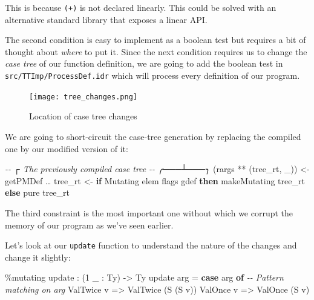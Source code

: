 \documentclass[
]{article}
\newenvironment{Shaded}{}{}
\newcommand{\CommentTok}[1]{\textcolor[rgb]{0.38,0.63,0.69}{\textit{#1}}}
\newcommand{\DataTypeTok}[1]{\textcolor[rgb]{0.56,0.13,0.00}{#1}}
\newcommand{\DecValTok}[1]{\textcolor[rgb]{0.25,0.63,0.44}{#1}}
\newcommand{\FunctionTok}[1]{\textcolor[rgb]{0.02,0.16,0.49}{#1}}
\newcommand{\KeywordTok}[1]{\textcolor[rgb]{0.00,0.44,0.13}{\textbf{#1}}}
\newcommand{\NormalTok}[1]{#1}
\newcommand{\OperatorTok}[1]{\textcolor[rgb]{0.40,0.40,0.40}{#1}}
\newcommand{\OtherTok}[1]{\textcolor[rgb]{0.00,0.44,0.13}{#1}}
\begin{document}
This is because \texttt{(+)} is not declared linearly. This could be
solved with an alternative standard library that exposes a linear API.

The second condition is easy to implement as a boolean test but requires
a bit of thought about \emph{where} to put it. Since the next condition
requires us to change the \emph{case tree} of our function definition,
we are going to add the boolean test in
\texttt{src/TTImp/ProcessDef.idr} which will process every definition of
our program.

\begin{figure}
\centering
\texttt{[image: tree\_changes.png]}
\caption{Location of case tree changes}
\end{figure}

We are going to short-circuit the case-tree generation by replacing the
compiled one by our modified version of it:

\begin{Shaded}
\begin{Highlighting}[]
\CommentTok{{-}{-}            ┌ The previously compiled case tree}
\CommentTok{{-}{-}        ╭───┴───╮}
\NormalTok{(rargs }\OperatorTok{**}\NormalTok{ (tree\_rt\textquotesingle{}, \_)) }\OtherTok{\textless{}{-}}\NormalTok{ getPMDef …}
\NormalTok{tree\_rt }\OtherTok{\textless{}{-}} \KeywordTok{if} \DataTypeTok{Mutating} \OtherTok{\textasciigrave{}elem\textasciigrave{}}\NormalTok{ flags gdef}
              \KeywordTok{then}\NormalTok{ makeMutating tree\_rt\textquotesingle{}}
              \KeywordTok{else} \FunctionTok{pure}\NormalTok{ tree\_rt\textquotesingle{}}
\end{Highlighting}
\end{Shaded}

The third constraint is the most important one without which we corrupt
the memory of our program as we've seen earlier.

Let's look at our \texttt{update} function to understand the nature of
the changes and change it slightly:

\begin{Shaded}
\begin{Highlighting}[]
\OperatorTok{\%}\NormalTok{mutating}
\NormalTok{update }\OperatorTok{:}\NormalTok{ (}\DecValTok{1}\NormalTok{ \_ }\OperatorTok{:} \DataTypeTok{Ty}\NormalTok{) }\OtherTok{{-}\textgreater{}} \DataTypeTok{Ty}
\NormalTok{update arg }\OtherTok{=} \KeywordTok{case}\NormalTok{ arg }\KeywordTok{of} \CommentTok{{-}{-} Pattern matching on arg}
                  \DataTypeTok{ValTwice}\NormalTok{ v }\OtherTok{=\textgreater{}} \DataTypeTok{ValTwice}\NormalTok{ (}\DataTypeTok{S}\NormalTok{ (}\DataTypeTok{S}\NormalTok{ v))}
                  \DataTypeTok{ValOnce}\NormalTok{ v }\OtherTok{=\textgreater{}} \DataTypeTok{ValOnce}\NormalTok{ (}\DataTypeTok{S}\NormalTok{ v)}
\end{Highlighting}
\end{Shaded}
\end{document}
